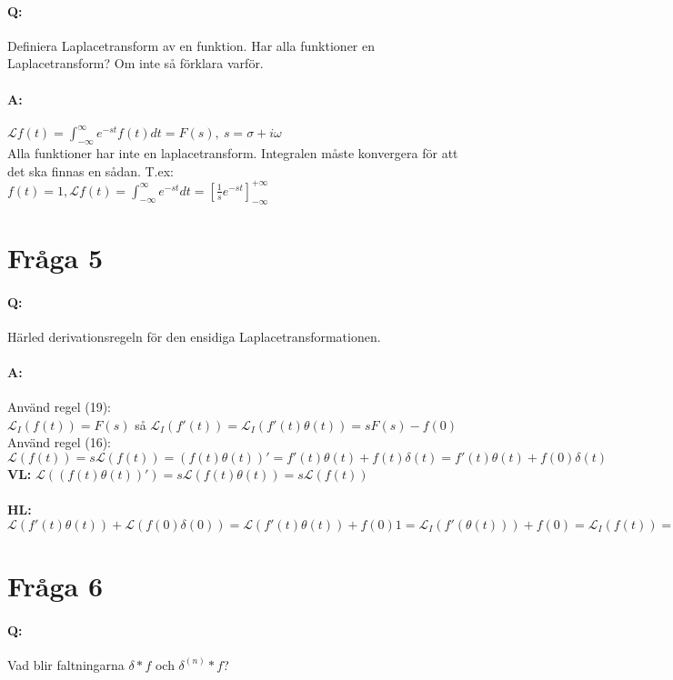 \documentclass[a4paper]{article}
\begin{document}
\paragraph{Q:} Definiera Laplacetransform av en funktion. Har alla funktioner en Laplacetransform? Om inte så förklara varför.
\paragraph{A:} $\mathcal{L} f(t) = \int_{-\infty}^{\infty} e^{-st}f(t)dt=F(s),\> s=\sigma + i \omega$ \\

Alla funktioner har inte en laplacetransform. Integralen måste konvergera för att det ska finnas en sådan. T.ex:\\$f(t)=1, \mathcal{L}f(t) = \int_{-\infty}^{\infty} e^{-st}dt = [\frac{1}{s} e^{-st}]_{-\infty}^{+\infty} $ 

\section{Fråga 5}
\paragraph{Q:} Härled derivationsregeln för den ensidiga Laplacetransformationen.
\paragraph{A:} Använd regel (19): \\  $\mathcal{L}_I (f(t)) = F(s)$ så $\mathcal{L}_I (f'(t)) =\mathcal{L}_I (f'(t) \theta (t)) = sF(s) - f(0)$ \\
Använd regel (16): \\  $\mathcal{L}(f(t)) = s\mathcal{L}(f(t)) = (f(t)\theta(t))' = f'(t)\theta(t) + f(t)\delta(t) = f'(t)\theta(t) + f(0)\delta(t)$ \\
\textbf{VL:} $\mathcal{L}((f(t)\theta(t))') = s\mathcal{L}(f(t)\theta(t)) = s\mathcal{L}(f(t)) $ \\ \\
\textbf{HL:} $\mathcal{L}(f'(t)\theta(t)) + \mathcal{L}(f(0)\delta(0)) = \mathcal{L}(f'(t)\theta(t)) +f(0)1 = \mathcal{L}_I(f'(\theta(t))) + f(0) = \mathcal{L}_I(f(t)) = s\mathcal{L}_I(f(t)) - f(0) $

\section{Fråga 6}
\paragraph{Q:} Vad blir faltningarna $\delta * f$ och $\delta ^{(n)} * f$?
\end{document}
